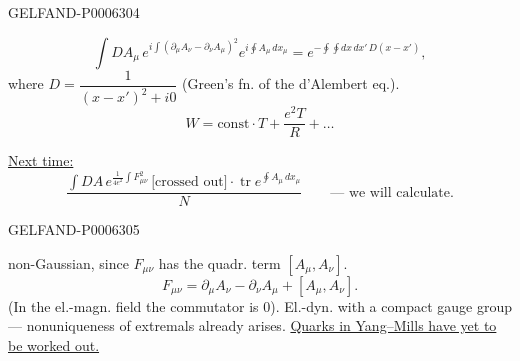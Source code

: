 \begin{GelfandAdjacentEvidence}{GELFAND-P000630}{4}

\[
\int DA_\mu\, e^{i\int(\partial_\mu A_\nu-\partial_\nu A_\mu)^2}
 e^{i\oint A_\mu\,dx_\mu}
=e^{-\oint\!\oint dx\,dx'\,D(x-x')},
\]
where \(D=\dfrac{1}{(x-x')^2+i0}\) (Green’s fn. of the d’Alembert eq.).
\[
W=\mathrm{const}\cdot T+\frac{e^2T}{R}+\ldots
\]

\underline{Next time:}
\[
\frac{\int DA\,e^{\frac{1}{4e^2}\int F_{\mu\nu}^{2}}\,
\text{[crossed out]}\cdot\operatorname{tr}e^{\oint A_\mu\,dx_\mu}}{N}
\qquad\text{--- we will calculate}.
\]
\end{GelfandAdjacentEvidence}
\begin{GelfandAdjacentEvidence}{GELFAND-P000630}{5}

non-Gaussian, since \(F_{\mu\nu}\) has the quadr. term \([A_\mu,A_\nu]\).
\[
F_{\mu\nu}=\partial_\mu A_\nu-\partial_\nu A_\mu+[A_\mu,A_\nu].
\]
(In the el.-magn. field the commutator is \(0\)).
El.-dyn. with a compact gauge group --- nonuniqueness of extremals already arises.
\underline{Quarks in Yang--Mills have yet to be worked out.}
\end{GelfandAdjacentEvidence}

\begin{center}\textemdash\,\textperiodcentered\,\textemdash\end{center}


